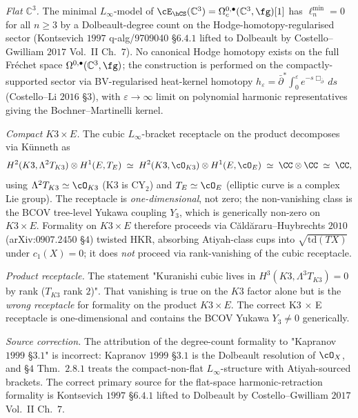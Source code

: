 \begin{theorem}
\label{wn:thm:second-pass-formality}

\emph{Flat $\mathbb{C}^3$.} The minimal $L_\infty$-model of
$\cE_{\hCS}(\mathbb{C}^3) = \Omega^{0,\bullet}_c(\mathbb{C}^3,
\fg)[1]$ has $\ell_n^{\min} = 0$ for all $n \geq 3$ by a
Dolbeault-degree count on the Hodge-homotopy-regularised sector
(Kontsevich $1997$ q-alg/9709040 \S$6.4.1$ lifted to Dolbeault by
Costello--Gwilliam $2017$ Vol.~II Ch.~$7$). No canonical Hodge
homotopy exists on the full Fr\'echet space
$\Omega^{0,\bullet}(\mathbb{C}^3, \fg)$; the construction is performed
on the compactly-supported sector via BV-regularised heat-kernel
homotopy $h_{\varepsilon} = \bar\partial^{\ast}
\int_0^{\varepsilon} e^{-s\Box_{\bar\partial}}\, ds$
(Costello--Li $2016$ \S$3$), with $\varepsilon \to \infty$ limit on
polynomial harmonic representatives giving the Bochner--Martinelli
kernel.

\emph{Compact $K3 \times E$.} The cubic $L_\infty$-bracket receptacle
on the product decomposes via K\"unneth as
\[
H^2(K3, \Lambda^2 T_{K3}) \otimes H^1(E, T_E)
\;\simeq\; H^2(K3, \cO_{K3}) \otimes H^1(E, \cO_E)
\;\simeq\; \CC \otimes \CC
\;\simeq\; \CC,
\]
using $\Lambda^2 T_{K3} \simeq \cO_{K3}$ (K3 is CY$_2$) and
$T_E \simeq \cO_E$ (elliptic curve is a complex Lie group). The
receptacle is \emph{one-dimensional}, not zero; the non-vanishing
class is the BCOV tree-level Yukawa coupling $Y_3$, which is generically
non-zero on $K3 \times E$. Formality on $K3 \times E$ therefore
proceeds via C\u{a}ld\u{a}raru--Huybrechts $2010$
(arXiv:$0907.2450$ \S$4$) twisted HKR, absorbing Atiyah-class cups into
$\sqrt{\mathrm{td}(TX)}$ under $c_1(X) = 0$; it does \emph{not}
proceed via rank-vanishing of the cubic receptacle.

\emph{Product receptacle.} The statement "Kuranishi cubic lives in
$H^3(K3, \Lambda^3 T_{K3}) = 0$ by rank ($T_{K3}$ rank $2$)". That
vanishing is true on the $K3$ factor alone but is the \emph{wrong
receptacle} for formality on the product $K3 \times E$. The correct
K3 $\times$ E receptacle is one-dimensional and contains the BCOV
Yukawa $Y_3 \neq 0$ generically.

\emph{Source correction.} The attribution of the degree-count
formality to "Kapranov $1999$ \S$3.1$" is incorrect:
Kapranov $1999$ \S$3.1$ is the Dolbeault resolution of $\cO_X$, and
\S$4$ Thm.~$2.8.1$ treats the compact-non-flat $L_\infty$-structure
with Atiyah-sourced brackets. The correct primary source for the
flat-space harmonic-retraction formality is Kontsevich $1997$
\S$6.4.1$ lifted to Dolbeault by Costello--Gwilliam $2017$ Vol.~II
Ch.~$7$.
\end{theorem}

